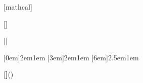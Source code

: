 \usepackage[utf8]{inputenc}
\usepackage{subfiles}
\usepackage[left=0.85in,right=0.85in,top=0.89in,bottom=1.15in]{geometry}
\usepackage{amsmath}
\usepackage{amssymb}
\usepackage{amsthm}
\usepackage{mathrsfs}
\usepackage{enumitem}
\usepackage{tikz-cd}
\usepackage{epigraph}
\usepackage[super]{nth}
\usepackage{titlesec}
\usepackage{titletoc}
\usepackage{soul}
\usepackage[hidelinks]{hyperref}
\usepackage{calligra}
\usepackage{mathtools}
\usepackage{eucal}[mathcal]


\allowdisplaybreaks[1]



[\setcounter{section}{0}]
[\setcounter{subsection}{0}]



[0em]{\sc}{2em}{1em}
[3em]{\bfseries}{2em}{1em}
[6em]{}{2.5em}{1em}

\renewcommand{\contentsname}{\centering Contents}

[\textbf]{(}{)}

